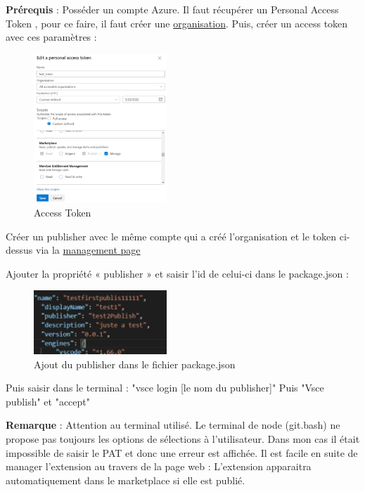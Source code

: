 \documentclass[
    iict, %
    il, %
]{heig-tb}
\begin{document}
\textbf{Prérequis} : Posséder un compte Azure.
Il faut récupérer un Personal Access Token , pour ce faire, il faut créer une \href{https://docs.microsoft.com/en-us/azure/devops/organizations/accounts/create-organization?view=azure-devops}{organisation}.
Puis, créer un access token avec ces paramètres :
\begin{figure}[!ht]
    \begin{center}
        \includegraphics[width=5cm]{assets/figures/access-token.png}
    \end{center}
    \caption[Access Token]{\label{access-token}Access Token}
\end{figure}

Créer un publisher avec le même compte qui a créé l’organisation et le token ci-dessus via la \href{https://marketplace.visualstudio.com/manage/publishers/}{management page}

Ajouter la propriété « publisher » et saisir l’id de celui-ci dans le package.json :

\begin{figure}[!ht]
    \begin{center}
        \includegraphics[width=5cm]{assets/figures/json-publisher.png}
    \end{center}
    \caption[Ajout du publisher dans le fichier package.json]{\label{json-publisher} Ajout du publisher dans le fichier package.json}
\end{figure}

Puis saisir dans le terminal : "vsce login [le nom du publisher]"
Puis "Vsce publish" et "accept"

\textbf{Remarque} : Attention au terminal utilisé. Le terminal de node (git.bash) ne propose pas toujours les options de sélections à l’utilisateur. Dans mon cas il était impossible de saisir le PAT et donc une erreur est affichée.
Il est facile en suite de manager l’extension au travers de la page web :
L’extension apparaitra automatiquement dans le marketplace si elle est publié.
\end{document}
